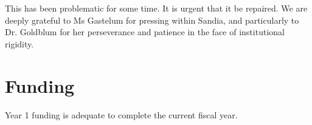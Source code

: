 \documentclass[11pt]{article} %
\begin{document}
This has been problematic for some time. It is urgent that it be repaired. We are deeply grateful to Ms Gastelum for pressing within Sandia, and particularly to Dr. Goldblum for her perseverance and patience in the face of institutional rigidity.

\section{Funding}
Year 1 funding is adequate to complete the current fiscal year.\
\end{document}
